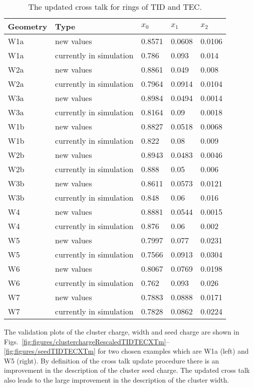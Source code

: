 \begin{table}[h]
\begin{center}
\begin{tabular}{|l|l|l|l|l|}
\hline
Geometry & Type & $x_{0}$ & $x_{1}$ & $x_{2}$ \\
\hline
\hline
W1a &  new values & 0.8571 & 0.0608 & 0.0106 \\
W1a &  currently in simulation & 0.786 & 0.093 & 0.014 \\
\hline
W2a &  new values & 0.8861 & 0.049 & 0.008 \\
W2a &  currently in simulation & 0.7964 & 0.0914 & 0.0104 \\
\hline
W3a &  new values & 0.8984 & 0.0494 & 0.0014 \\
W3a &  currently in simulation & 0.8164 & 0.09 & 0.0018 \\
\hline
W1b &  new values & 0.8827 & 0.0518 & 0.0068 \\
W1b &  currently in simulation & 0.822 & 0.08 & 0.009 \\
\hline
W2b &  new values & 0.8943 & 0.0483 & 0.0046 \\
W2b &  currently in simulation & 0.888 & 0.05 & 0.006 \\
\hline
W3b &  new values & 0.8611 & 0.0573 & 0.0121 \\
W3b &  currently in simulation & 0.848 & 0.06 & 0.016 \\
\hline
W4 &  new values & 0.8881 & 0.0544 & 0.0015 \\
W4 &  currently in simulation & 0.876 & 0.06 & 0.002 \\
\hline
W5 &  new values & 0.7997 & 0.077 & 0.0231 \\
W5 &  currently in simulation & 0.7566 & 0.0913 & 0.0304 \\
\hline
W6 &  new values & 0.8067 & 0.0769 & 0.0198 \\
W6 &  currently in simulation & 0.762 & 0.093 & 0.026 \\
\hline
W7 &  new values & 0.7883 & 0.0888 & 0.0171 \\
W7 &  currently in simulation & 0.7828 & 0.0862 & 0.0224 \\
\hline
\end{tabular}
\caption[Table caption text]{The updated cross talk for rings of TID and TEC. }
\label{tab:measuredXtalkTODTEC}
\end{center}
\end{table}


The validation plots of the cluster charge, width and seed charge are shown in Figs.~\ref{fig:figures/clusterchargeRescaledTIDTECXTm}--\ref{fig:figures/seedTIDTECXTm} for two chosen examples which are W1a (left) and W5 (right). By definition of the cross talk update procedure there is an improvement in the description of the cluster seed charge. The updated cross talk also leads to the large improvement in the description of the cluster width.

